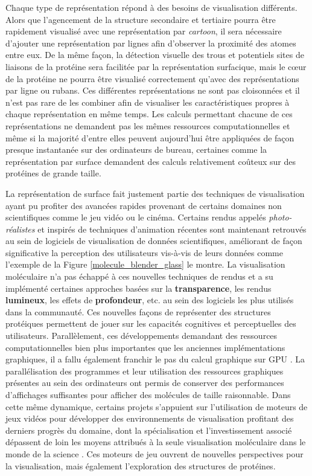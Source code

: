 Chaque type de représentation répond à des besoins de visualisation différents. Alors que l'agencement de la structure secondaire et tertiaire pourra être rapidement visualisé avec une représentation par \textit{cartoon}, il sera nécessaire d'ajouter une représentation par lignes afin d'observer la proximité des atomes entre eux. De la même façon, la détection visuelle des trous et potentiels sites de liaisons de la protéine sera facilitée par la représentation surfacique, mais le cœur de la protéine ne pourra être visualisé correctement qu'avec des représentations par ligne ou rubans. Ces différentes représentations ne sont pas cloisonnées et il n'est pas rare de les combiner afin de visualiser les caractéristiques propres à chaque représentation en même temps. Les calculs permettant chacune de ces représentations ne demandent pas les mêmes ressources computationnelles et même si la majorité d'entre elles peuvent aujourd'hui être appliquées de façon presque instantanée sur des ordinateurs de bureau, certaines comme la représentation par surface demandent des calculs relativement coûteux sur des protéines de grande taille.

La représentation de surface fait justement partie des techniques de visualisation ayant pu profiter des avancées rapides provenant de certains domaines non scientifiques comme le jeu vidéo ou le cinéma. Certains rendus appelés \textit{photo-réalistes} et inspirés de techniques d'animation récentes sont maintenant retrouvés au sein de logiciels de visualisation de données scientifiques, améliorant de façon significative la perception des utilisateurs vis-à-vis de leurs données comme l'exemple de la Figure \ref{molecule_blender_glass} le montre. La visualisation moléculaire n'a pas échappé à ces nouvelles techniques de rendus et a su implémenté certaines approches basées sur la \textbf{transparence}, les rendus \textbf{lumineux}, les effets de \textbf{profondeur}, etc. au sein des logiciels les plus utilisés dans la communauté. Ces nouvelles façons de représenter des structures protéiques permettent de jouer sur les capacités cognitives et perceptuelles des utilisateurs. Parallèlement, ces développements demandant des ressources computationnelles bien plus importantes que les anciennes implémentations graphiques, il a fallu également franchir le pas du calcul graphique sur GPU \cite{chavent_gpu-powered_2011}. La parallélisation des programmes et leur utilisation des ressources graphiques présentes au sein des ordinateurs ont permis de conserver des performances d'affichages suffisantes pour afficher des molécules de taille raisonnable. Dans cette même dynamique, certains projets s'appuient sur l'utilisation de moteurs de jeux vidéos pour développer des environnements de visualisation profitant des derniers progrès du domaine, dont la spécialisation et l'investissement associé dépassent de loin les moyens attribués à la seule visualisation moléculaire dans le monde de la science \cite{andrei2012intuitive,lv_game_2013}. Ces moteurs de jeu ouvrent de nouvelles perspectives pour la visualisation, mais également l'exploration des structures de protéines.

